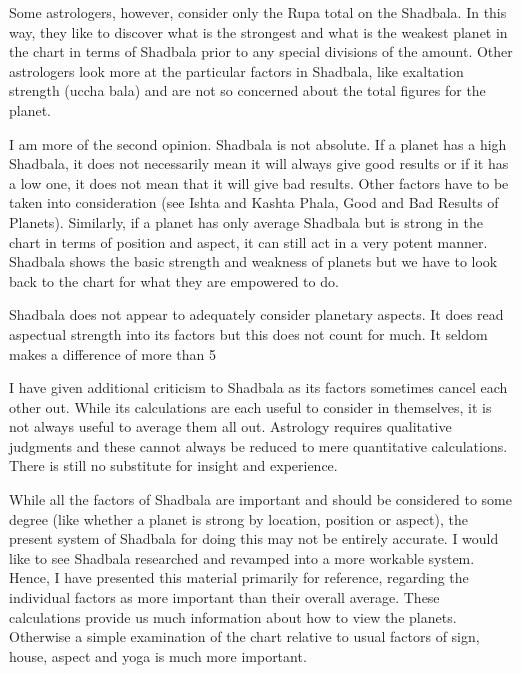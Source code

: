  

Some astrologers, however, consider only the Rupa total on the Shadbala. In this way, they like to discover what is the strongest and what is the weakest planet in the chart in terms of Shadbala prior to any special divisions of the amount.
Other astrologers look more at the particular factors in Shadbala, like exaltation strength (uccha bala) and are not so concerned about the total figures for the planet.
 

I am more of the second opinion. Shadbala is not absolute. If a planet has a high Shadbala, it does not necessarily mean it will always give good results or if it has a low one, it does not mean that it will give bad results. Other factors have to be taken into consideration (see Ishta and Kashta Phala, Good and Bad Results of Planets). Similarly, if a planet has only average Shadbala but is strong in the chart in terms of position and aspect, it can still act in a very potent manner. Shadbala shows the basic strength and weakness of planets but we have to look back to the chart for what they are empowered to do.

 

Shadbala does not appear to adequately consider planetary aspects. It does read aspectual strength into its factors but this does not count for much. It seldom makes a difference of more than 5%

 

I have given additional criticism to Shadbala as its factors sometimes cancel each other out. While its calculations are each useful to consider in themselves, it is not always useful to average them all out. Astrology requires qualitative judgments and these cannot always be reduced to mere quantitative calculations. There is still no substitute for insight and experience.

 

While all the factors of Shadbala are important and should be considered to some degree (like whether a planet is strong by location, position or aspect), the present system of Shadbala for doing this may not be entirely accurate. I would like to see Shadbala researched and revamped into a more workable system. Hence, I have presented this material primarily for reference, regarding the individual factors as more important than their overall average. These calculations provide us much information about how to view the planets. Otherwise a simple examination of the chart relative to usual factors of sign, house, aspect and yoga is much more important.

